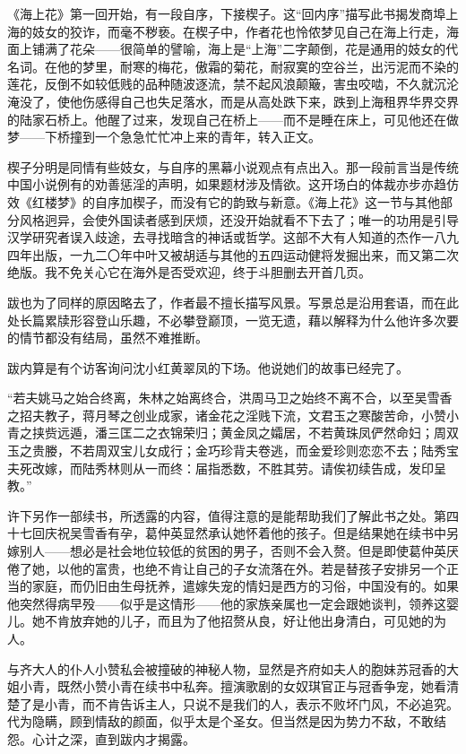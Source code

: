 \par 《海上花》第一回开始，有一段自序，下接楔子。这“回内序”描写此书揭发商埠上海的妓女的狡诈，而毫不秽亵。在楔子中，作者花也怜侬梦见自己在海上行走，海面上铺满了花朵——很简单的譬喻，海上是“上海”二字颠倒，花是通用的妓女的代名词。在他的梦里，耐寒的梅花，傲霜的菊花，耐寂寞的空谷兰，出污泥而不染的莲花，反倒不如较低贱的品种随波逐流，禁不起风浪颠簸，害虫咬啮，不久就沉沦淹没了，使他伤感得自己也失足落水，而是从高处跌下来，跌到上海租界华界交界的陆家石桥上。他醒了过来，发现自己在桥上——而不是睡在床上，可见他还在做梦——下桥撞到一个急急忙忙冲上来的青年，转入正文。
\par 楔子分明是同情有些妓女，与自序的黑幕小说观点有点出入。那一段前言当是传统中国小说例有的劝善惩淫的声明，如果题材涉及情欲。这开场白的体裁亦步亦趋仿效《红楼梦》的自序加楔子，而没有它的韵致与新意。《海上花》这一节与其他部分风格迥异，会使外国读者感到厌烦，还没开始就看不下去了；唯一的功用是引导汉学研究者误入歧途，去寻找暗含的神话或哲学。这部不大有人知道的杰作一八九四年出版，一九二〇年中叶又被胡适与其他的五四运动健将发掘出来，而又第二次绝版。我不免关心它在海外是否受欢迎，终于斗胆删去开首几页。
\par 跋也为了同样的原因略去了，作者最不擅长描写风景。写景总是沿用套语，而在此处长篇累牍形容登山乐趣，不必攀登巅顶，一览无遗，藉以解释为什么他许多次要的情节都没有结局，虽然不难推断。
\par 跋内算是有个访客询问沈小红黄翠凤的下场。他说她们的故事已经完了。
\par “若夫姚马之始合终离，朱林之始离终合，洪周马卫之始终不离不合，以至吴雪香之招夫教子，蒋月琴之创业成家，诸金花之淫贱下流，文君玉之寒酸苦命，小赞小青之挟赀远遁，潘三匡二之衣锦荣归；黄金凤之孀居，不若黄珠凤俨然命妇；周双玉之贵媵，不若周双宝儿女成行；金巧珍背夫卷逃，而金爱珍则恋恋不去；陆秀宝夫死改嫁，而陆秀林则从一而终：届指悉数，不胜其劳。请俟初续告成，发印呈教。”
\par 许下另作一部续书，所透露的内容，值得注意的是能帮助我们了解此书之处。第四十七回庆祝吴雪香有孕，葛仲英显然承认她怀着他的孩子。但是结果她在续书中另嫁别人——想必是社会地位较低的贫困的男子，否则不会入赘。但是即使葛仲英厌倦了她，以他的富贵，也绝不肯让自己的子女流落在外。若是替孩子安排另一个正当的家庭，而仍旧由生母抚养，遣嫁失宠的情妇是西方的习俗，中国没有的。如果他突然得病早殁——似乎是这情形——他的家族亲属也一定会跟她谈判，领养这婴儿。她不肯放弃她的儿子，而且为了他招赘从良，好让他出身清白，可见她的为人。
\par 与齐大人的仆人小赞私会被撞破的神秘人物，显然是齐府如夫人的胞妹苏冠香的大姐小青，既然小赞小青在续书中私奔。擅演歌剧的女奴琪官正与冠香争宠，她看清楚了是小青，而不肯告诉主人，只说不是我们的人，表示不败坏门风，不必追究。代为隐瞒，顾到情敌的颜面，似乎太是个圣女。但当然是因为势力不敌，不敢结怨。心计之深，直到跋内才揭露。
